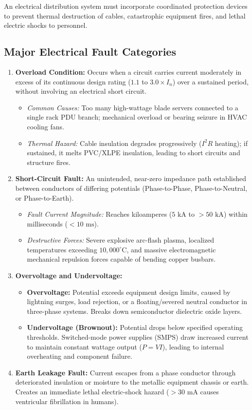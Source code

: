 An electrical distribution system must incorporate coordinated protection devices to prevent thermal destruction of cables, catastrophic equipment fires, and lethal electric shocks to personnel.

\subsection{Major Electrical Fault Categories}
\begin{enumerate}[label=\bfseries\arabic*.]
    \item \textbf{Overload Condition:} Occurs when a circuit carries current moderately in excess of its continuous design rating ($1.1$ to $3.0 \times I_n$) over a sustained period, without involving an electrical short circuit.
    \begin{itemize}
        \item \textit{Common Causes:} Too many high-wattage blade servers connected to a single rack PDU branch; mechanical overload or bearing seizure in HVAC cooling fans.
        \item \textit{Thermal Hazard:} Cable insulation degrades progressively ($I^2R$ heating); if sustained, it melts PVC/XLPE insulation, leading to short circuits and structure fires.
    \end{itemize}
    \item \textbf{Short-Circuit Fault:} An unintended, near-zero impedance path established between conductors of differing potentials (Phase-to-Phase, Phase-to-Neutral, or Phase-to-Earth).
    \begin{itemize}
        \item \textit{Fault Current Magnitude:} Reaches kiloamperes ($5\text{ kA}$ to $>50\text{ kA}$) within milliseconds ($<10\text{ ms}$).
        \item \textit{Destructive Forces:} Severe explosive arc-flash plasma, localized temperatures exceeding $10,000^{\circ}\text{C}$, and massive electromagnetic mechanical repulsion forces capable of bending copper busbars.
    \end{itemize}
    \item \textbf{Overvoltage and Undervoltage:}
    \begin{itemize}
        \item \textbf{Overvoltage:} Potential exceeds equipment design limits, caused by lightning surges, load rejection, or a floating/severed neutral conductor in three-phase systems. Breaks down semiconductor dielectric oxide layers.
        \item \textbf{Undervoltage (Brownout):} Potential drops below specified operating thresholds. Switched-mode power supplies (SMPS) draw increased current to maintain constant wattage output ($P = VI$), leading to internal overheating and component failure.
    \end{itemize}
    \item \textbf{Earth Leakage Fault:} Current escapes from a phase conductor through deteriorated insulation or moisture to the metallic equipment chassis or earth. Creates an immediate lethal electric-shock hazard ($>30\text{ mA}$ causes ventricular fibrillation in humans).
\end{enumerate}

